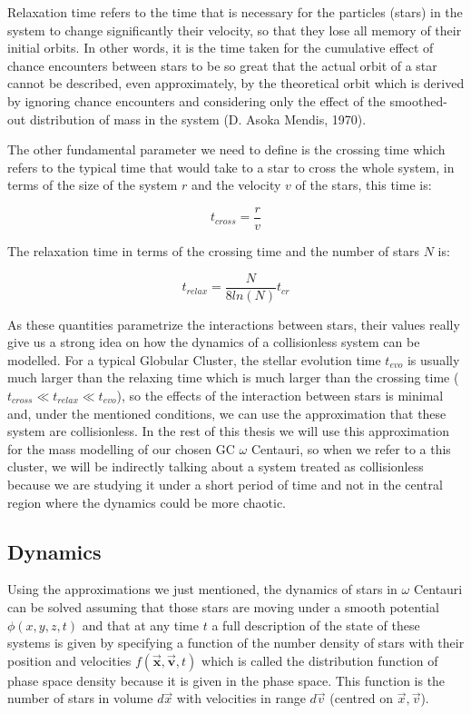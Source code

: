 Relaxation time refers to the time that is necessary for the particles (stars) in the system to change significantly their velocity, so that they lose all memory of their initial orbits. In other words, it is the time taken for the cumulative effect of chance encounters between stars to be so great that the actual orbit of a star cannot be described, even approximately, by the theoretical orbit which is derived by ignoring chance encounters and considering only the effect of the smoothed-out distribution of mass in the system (D. Asoka Mendis, 1970). 

The other fundamental parameter we need to define is the crossing time which refers to the typical time that would take to a star to cross the whole system, in terms of the size of the system $r$ and the velocity $v$ of the stars, this time is:

\begin{equation}
t_{cross}=\frac{r}{v}
\end{equation}

The relaxation time in terms of the crossing time and the number of stars $N$ is:

\begin{equation}
t_{relax}=\frac{N}{8ln(N)}t_{cr}
\end{equation}

As these quantities parametrize the interactions between stars, their values really give us a strong idea on how the dynamics of a collisionless system can be modelled. For a typical Globular Cluster, the stellar evolution time $t_{evo}$ is usually much larger than the relaxing time which is much larger than the crossing time ($t_{cross}\ll t_{relax}\ll t_{evo}$), so the effects of the interaction between stars is minimal and, under the mentioned conditions, we can use the approximation that these system are collisionless. In the rest of this thesis we will use this approximation for the mass modelling of our chosen GC $\omega$ Centauri, so when we refer to a this cluster, we will be indirectly talking about a system treated as collisionless because we are studying it under a short period of time and not in the central region where the dynamics could be more chaotic.

\subsection{Dynamics}

Using the approximations we just mentioned, the dynamics of stars in $\omega$ Centauri can be solved assuming that those stars are moving under a smooth potential $\phi (x,y,z,t)$ and that at any time $t$ a full description of the state of these systems is given by specifying a function of the number density of stars with their position and velocities $f(\vec{\textbf{x}},\vec{\textbf{v}},t)$ which is called the distribution function of phase space density because it is given in the phase space. This function is the number of stars in volume $d\vec{x}$ with velocities in range $d\vec{v}$ (centred on $\vec{x},\vec{v}$).

